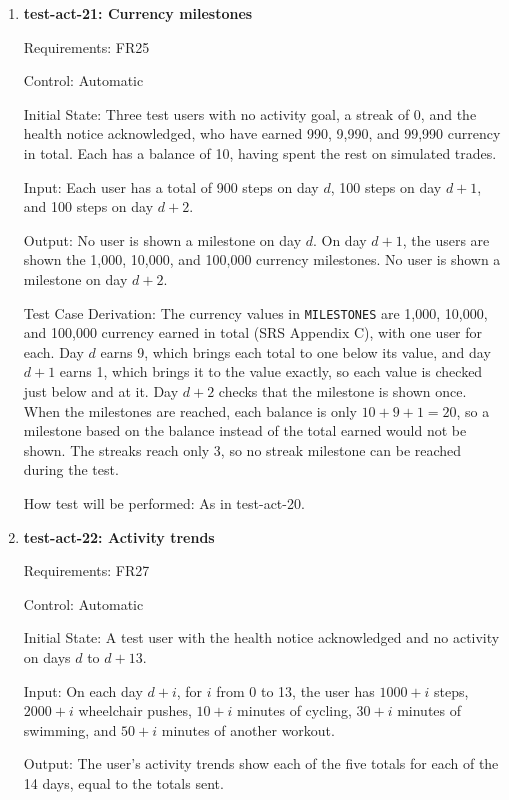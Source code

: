\documentclass[12pt, titlepage]{article}
\begin{document}
\begin{enumerate}
How test will be performed: A pytest test sends each day's totals, moving the
backend's clock between days, and reads the milestones to show each user
through the API at the end of each day.

\item{\textbf{test-act-21: Currency milestones}\\}

Requirements: FR25

Control: Automatic

Initial State: Three test users with no activity goal, a streak of 0, and the
health notice acknowledged, who have earned 990, 9,990, and 99,990 currency in
total. Each has a balance of 10, having spent the rest on simulated trades.

Input: Each user has a total of 900 steps on day $d$, 100 steps on day $d+1$,
and 100 steps on day $d+2$.

Output: No user is shown a milestone on day $d$. On day $d+1$, the users are
shown the 1,000, 10,000, and 100,000 currency milestones. No user is shown a
milestone on day $d+2$.

Test Case Derivation: The currency values in \texttt{MILESTONES} are 1,000,
10,000, and 100,000 currency earned in total (SRS Appendix C), with one user
for each. Day $d$ earns 9, which brings each total to one below its value, and
day $d+1$ earns 1, which brings it to the value exactly, so each value is
checked just below and at it. Day $d+2$ checks that the milestone is shown
once. When the milestones are reached, each balance is only
$10 + 9 + 1 = 20$, so a milestone based on the balance instead of the total
earned would not be shown. The streaks reach only 3, so no streak milestone
can be reached during the test.

How test will be performed: As in test-act-20.

\item{\textbf{test-act-22: Activity trends}\\}

Requirements: FR27

Control: Automatic

Initial State: A test user with the health notice acknowledged and no activity
on days $d$ to $d+13$.

Input: On each day $d+i$, for $i$ from 0 to 13, the user has $1000 + i$
steps, $2000 + i$ wheelchair pushes, $10 + i$ minutes of cycling, $30 + i$
minutes of swimming, and $50 + i$ minutes of another workout.

Output: The user's activity trends show each of the five totals for each of
the 14 days, equal to the totals sent.


\end{enumerate}
\end{document}
